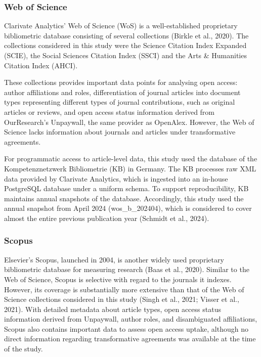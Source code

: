 \documentclass[a4paper,man,floatsintext,longtable,noextraspace,10pt]{apa6}
\begin{document}
\subsubsection{Web of Science}\label{web-of-science}

Clarivate Analytics' Web of Science (WoS) is a well-established
proprietary bibliometric database consisting of several collections
(Birkle et al., 2020). The collections considered in this study were the
Science Citation Index Expanded (SCIE), the Social Sciences Citation
Index (SSCI) and the Arts \& Humanities Citation Index (AHCI).

These collections provides important data points for analysing open
access: author affiliations and roles, differentiation of journal
articles into document types representing different types of journal
contributions, such as original articles or reviews, and open access
status information derived from OurResearch's Unpaywall, the same
provider as OpenAlex. However, the Web of Science lacks information
about journals and articles under transformative agreements.

For programmatic access to article-level data, this study used the
database of the Kompetenznetzwerk Bibliometrie (KB) in Germany. The KB
processes raw XML data provided by Clarivate Analytics, which is
ingested into an in-house PostgreSQL database under a uniform schema. To
support reproducibility, KB maintains annual snapshots of the database.
Accordingly, this study used the annual snapshot from April 2024
(wos\_b\_202404), which is considered to cover almost the entire
previous publication year (Schmidt et al., 2024).

\subsubsection{Scopus}\label{scopus}

Elsevier's Scopus, launched in 2004, is another widely used proprietary
bibliometric database for measuring research (Baas et al., 2020).
Similar to the Web of Science, Scopus is selective with regard to the
journals it indexes. However, its coverage is substantially more
extensive than that of the Web of Science collections considered in this
study (Singh et al., 2021; Visser et al., 2021). With detailed metadata
about article types, open access status information derived from
Unpaywall, author roles, and disambiguated affiliations, Scopus also
contains important data to assess open access uptake, although no direct
information regarding transformative agreements was available at the
time of the study.
\end{document}
